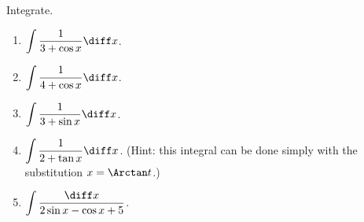 Integrate.
\begin{enumerate}[ref={\fcProblemRef}]
\item \label{problemInt1/(3+cos x)dx} $\displaystyle \int \frac{1}{3+\cos x}\diff x$.

\item $\displaystyle \int \frac{1}{4+\cos x}\diff x$.

\item $\displaystyle \int \frac{1}{3+\sin x}\diff x$.

\item \label{problemInt1/(2+tan x)dx}$\displaystyle \int \frac{1}{2+\tan x}\diff x$.  (Hint: this integral can be done simply with the substitution $x=\Arctan t$.)


\item \label{problemint1/(2sinx-cosx+5)dx} $\displaystyle \int \frac{ \diff x }{ 2\sin x - \cos x +5}$.


\end{enumerate}
